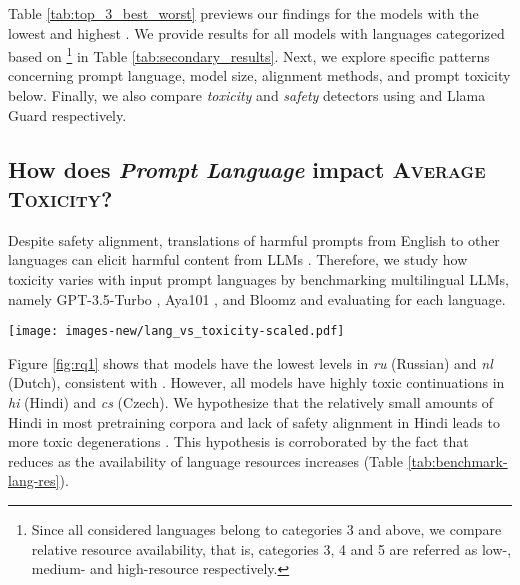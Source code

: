 Table \ref{tab:top_3_best_worst} previews our findings for the models with the lowest and highest \avgToxFull. We provide results for all models with languages categorized based on \cite{joshi-etal-2020-state}\footnote{Since all considered languages belong to categories 3 and above, we compare relative resource availability, that is, categories 3, 4 and 5 are referred as low-, medium- and high-resource respectively.} in Table \ref{tab:secondary_results}.
Next, we explore specific patterns concerning prompt language, model size, alignment methods, and prompt toxicity below. Finally, we also compare \textit{toxicity} and \textit{safety} detectors using \perspectiveAPI and Llama Guard \cite{inan2023llama} respectively.

\subsection{\textbf{How does \textit{Prompt Language} impact \textsc{Average Toxicity}?}}

Despite safety alignment, translations of harmful prompts from English to other languages can elicit harmful content from LLMs \citep{kotha2024understanding, Yong2023LowResourceLJ, deng2024multilingual}. Therefore, we study how toxicity varies with input prompt languages by benchmarking multilingual LLMs, namely GPT-3.5-Turbo \citep{ouyang2022training}, Aya101 \citep{ustun2024aya}, and Bloomz \citep{muennighoff-etal-2023-crosslingual} and evaluating \avgTox for each language.

\begin{figure*}[htpb]
    \begin{center}
    \texttt{[image: images-new/lang\_vs\_toxicity-scaled.pdf]}
    \caption{Language-wise \avgTox trends for multilingual models. \textbf{\textit{Takeaway}}: High toxicity scores (relative to the \avgTox levels shown in Figure \ref{fig:motivation_results} and Table \ref{tab:top_3_best_worst}) for all languages indicate the need for multilingual toxicity mitigation methods.
    }
    \label{fig:rq1}
    \end{center}
\end{figure*}

Figure \ref{fig:rq1} shows that models have the lowest \avgTox levels in \textit{ru} (Russian) and \textit{nl} (Dutch), consistent with \citet{ustun2024aya}. 
However, all models have highly toxic continuations in \textit{hi} (Hindi) and \textit{cs} (Czech). 
We hypothesize that the relatively small amounts of Hindi in most pretraining corpora and lack of safety alignment in Hindi leads to more toxic degenerations \citep{wang2023all, Yong2023LowResourceLJ, deng2024multilingual}. 
This hypothesis is corroborated by the fact that \avgTox reduces as the availability of language resources increases (Table \ref{tab:benchmark-lang-res}).

